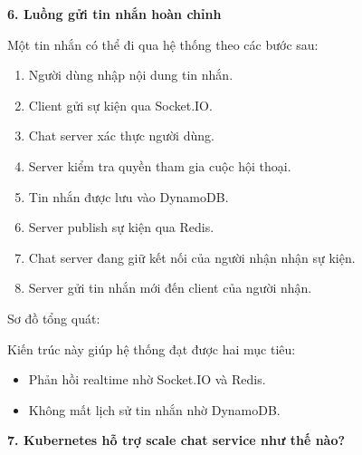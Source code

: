 \vspace{0.5em}\noindent\textbf{6. Luồng gửi tin nhắn hoàn
chỉnh}\par

Một tin nhắn có thể đi qua hệ thống theo các bước sau:

\begin{enumerate}
\def\labelenumi{\arabic{enumi}.}
\tightlist
\item
  Người dùng nhập nội dung tin nhắn.
\item
  Client gửi sự kiện qua Socket.IO.
\item
  Chat server xác thực người dùng.
\item
  Server kiểm tra quyền tham gia cuộc hội thoại.
\item
  Tin nhắn được lưu vào DynamoDB.
\item
  Server publish sự kiện qua Redis.
\item
  Chat server đang giữ kết nối của người nhận nhận sự kiện.
\item
  Server gửi tin nhắn mới đến client của người nhận.
\end{enumerate}

Sơ đồ tổng quát:

\begin{Shaded}
\begin{Highlighting}[]
\NormalTok{|}
\NormalTok{|}
\NormalTok{|}
\NormalTok{                         |}
\NormalTok{                         |}
\end{Highlighting}
\end{Shaded}

Kiến trúc này giúp hệ thống đạt được hai mục tiêu:

\begin{itemize}
\tightlist
\item
  Phản hồi realtime nhờ Socket.IO và Redis.
\item
  Không mất lịch sử tin nhắn nhờ DynamoDB.
\end{itemize}

\vspace{0.5em}\noindent\textbf{7. Kubernetes hỗ trợ scale chat service như thế
nào?}\par

